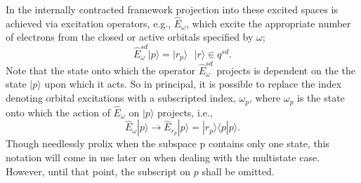 \documentclass[12pt]{article}
\begin{document}
\noindent In the internally contracted framework projection into these excited spaces is achieved via excitation operators, e.g., $\hat{E}_{\omega}$,
which excite the appropriate number of electrons from the closed or active orbitals specified by $\omega$; 
\begin{equation}
\hat{E}^{sd}_{\omega}|p\rangle = |r_{p}\rangle  \text{ \ \ \ \ } |r\rangle \in q^{sd} .
\end{equation}
Note that the state onto which the operator $\hat{E}^{sd}_{\omega}$ projects is dependent on the
the state $|p\rangle $  upon which it acts. So in principal, it is possible to replace the index denoting 
orbital excitations with a subscripted index, $\omega_{p}$, where $\omega_{p}$ is the state onto which
the action of $\hat{E}_{\omega}$ on $|p\rangle$ projects, i.e.,
\begin{equation}
\hat{E}_{\omega} |p\rangle \rightarrow 
\hat{E}_{r_{p}} |p\rangle = | r_{p} \rangle \langle p | p \rangle .
\end{equation}
Though needlessly prolix when the subspace $\mathrm{p}$ contains only one state, this notation will
come in use later on when dealing with the multistate case. However, until that point, the subscript on $p$
shall be omitted.\\
\end{document}
